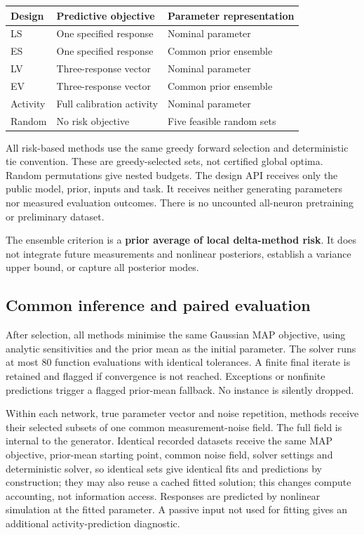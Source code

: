 \begin{table}[!t]
\centering\small
\begin{tabular*}{\textwidth}{@{\extracolsep{\fill}}lll}
\toprule
Design & Predictive objective & Parameter representation \\
\midrule
LS & One specified response & Nominal parameter \\
ES & One specified response & Common prior ensemble \\
LV & Three-response vector & Nominal parameter \\
EV & Three-response vector & Common prior ensemble \\
Activity & Full calibration activity & Nominal parameter \\
Random & No risk objective & Five feasible random sets \\
\bottomrule
\end{tabular*}
\end{table}

All risk-based methods use the same greedy forward selection and deterministic tie convention. These are greedy-selected sets, not certified global optima. Random permutations give nested budgets. The design API receives only the public model, prior, inputs and task. It receives neither generating parameters nor measured evaluation outcomes. There is no uncounted all-neuron pretraining or preliminary dataset.

The ensemble criterion is a \textbf{prior average of local delta-method risk}. It does not integrate future measurements and nonlinear posteriors, establish a variance upper bound, or capture all posterior modes.

\subsection{Common inference and paired evaluation}

After selection, all methods minimise the same Gaussian MAP objective, using analytic sensitivities and the prior mean as the initial parameter. The solver runs at most 80 function evaluations with identical tolerances. A finite final iterate is retained and flagged if convergence is not reached. Exceptions or nonfinite predictions trigger a flagged prior-mean fallback. No instance is silently dropped.

Within each network, true parameter vector and noise repetition, methods receive their selected subsets of one common measurement-noise field. The full field is internal to the generator. Identical recorded datasets receive the same MAP objective, prior-mean starting point, common noise field, solver settings and deterministic solver, so identical sets give identical fits and predictions by construction; they may also reuse a cached fitted solution; this changes compute accounting, not information access. Responses are predicted by nonlinear simulation at the fitted parameter. A passive input not used for fitting gives an additional activity-prediction diagnostic.


